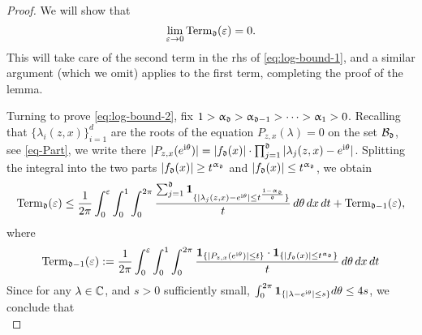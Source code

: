 \documentclass{amsart}
\numberwithin{equation}{section}
\def\corEE{\textcolor{amethyst}}
\def\corEE{}
\def\corAB{}
\def\corOZ{}
\newcommand{\abbr}[1]{{\sc\lowercase{#1}}}
\begin{document}
\begin{proof}
We will show that
\begin{equation}\label{eq:log-bound-2}
\lim_{\varepsilon \to 0} \mathrm{Term}_{\mathfrak{d}}(\varepsilon)=0.
\end{equation}
This will take care of the second term in
the \abbr{RHS} of \eqref{eq:log-bound-1},
and a similar argument (which we omit)
appl\corEE{ies} to the first term, completing the proof of the lemma.

Turning to prove \eqref{eq:log-bound-2}, fix
$ 1> \upalpha_{\mathfrak{d}} > \upalpha_{\mathfrak{d} -1} > \cdots >\upalpha_1>0$.
Recalling that $\{\lambda_i(z,x)\}_{i=1}^d$
are the roots of the equation $P_{z,x}(\lambda)=0$
on the set $\mathcal{B}_{\mathfrak{d}}$, \corOZ{see \eqref{eq-Part},} we write there
$|P_{z,x}(e^{\mathrm{i}\theta})| =
|f_{\mathfrak{d}}(x)| \cdot \prod_{j=1}^{\mathfrak{d}} |\lambda_j(z,x) - e^{\mathrm{i}\theta}|$.
\corAB{Splitting the integral into the
  two parts $|f_{\mathfrak{d}}(x)| \ge t^{\upalpha_{\mathfrak{d}}}$
  and $|f_{\mathfrak{d}}(x)| \le t^{\upalpha_{\mathfrak{d}}}$, we obtain}
\[\mathrm{Term}_{\mathfrak{d}}(\varepsilon) \le \frac{1}{2 \pi}\int_0^\varepsilon \int_{0}^1 \int_0^{2 \pi}  \frac{\sum_{j=1}^{\mathfrak{d}} {\bf 1}_{\{ |\lambda_j(z,x)-e^{\mathrm{i}
\theta}| \le t^{\frac{1-\upalpha_{\mathfrak{d}}}{\mathfrak{d}}}\}}}{t} \, d\theta \,
d x \, dt + \mathrm{Term}_{\mathfrak{d}-1}(\varepsilon),
\]
where
\[
\mathrm{Term}_{\mathfrak{d}-1}(\varepsilon):= \frac{1}{2 \pi}\int_0^\varepsilon
\int_{0}^1 \int_0^{2 \pi}  \frac{{\bf 1}_{\{ |P_{z,x}(e^{\mathrm{i}\theta})|
\le t \}}\cdot {\bf 1}_{\{ |f_{\mathfrak{d}}(x)| \le t^{\upalpha_{\mathfrak{d}}}\}}}{t} \, d\theta \, d x \, dt
\]
Since for any $\lambda \in \mathbb{C}$, and $s >0$ sufficiently small,
$\int_0^{2\pi} {\bf 1}_{\{|\lambda - e^{\mathrm{i} \theta}| \le s\}}
 d\theta \leq \corAB{4}s$,
 we conclude that
 \begin{equation}
   \label{eq-dtod-1}

\end{equation}
\end{proof}
\end{document}
